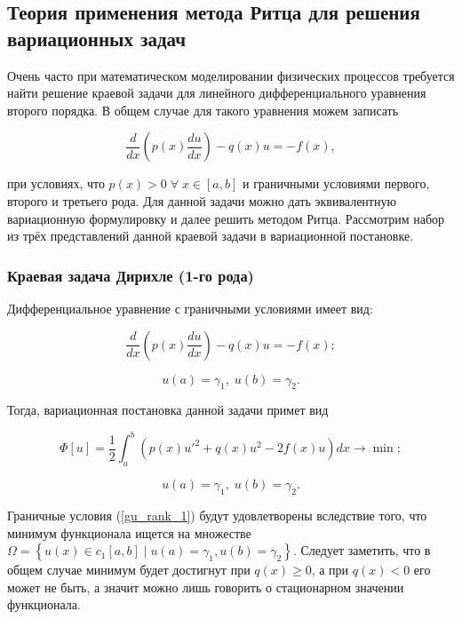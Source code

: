 \documentclass{article}
\begin{document}
\subsection{Теория применения метода Ритца для решения вариационных задач}

Очень часто при математическом моделировании физических процессов требуется найти решение краевой задачи для линейного дифференциального уравнения второго порядка. В общем случае для такого уравнения можем записать

\begin{equation}\label{ODE_rank_2}
	\frac{d }{dx} \left( p(x) \frac{du}{dx} \right) - q(x)u = -f(x),
\end{equation}

\noindent при условиях, что $p(x) > 0 \; \forall \; x \in \left[ a, b \right]$ и граничными условиями первого, второго и третьего рода. Для данной задачи можно дать эквивалентную вариационную формулировку и далее решить методом Ритца.
Рассмотрим набор из трёх представлений данной краевой задачи в вариационной постановке.

\subsubsection{Краевая задача Дирихле (1-го рода)}

Дифференциальное уравнение с граничными условиями имеет вид:

\begin{displaymath}
	\frac{d }{dx} \left( p(x) \frac{du}{dx} \right) - q(x)u = -f(x);
\end{displaymath}

\begin{equation} \label{gu_rank_1}
	u(a) = \gamma_{1}, \; u(b) = \gamma_{2}.
\end{equation}

\noindent Тогда, вариационная постановка данной задачи примет вид

\begin{displaymath}
	\Phi[u] = \frac{1}{2} \int_{a}^{b} \left( p(x)u'^{2} + q(x)u^{2} - 2f(x)u \right)dx \to \min;
\end{displaymath}

\begin{displaymath}
	u(a) = \gamma_{1}, \; u(b) = \gamma_{2}.
\end{displaymath}

Граничные условия (\ref{gu_rank_1}) будут удовлетворены вследствие того, что минимум функционала ищется на множестве $\Omega = \left\{ u(x) \in c_{1}\left[ a, b \right] \; | \; u(a)=\gamma_{1}, u(b)=\gamma_{2} \right\}$. Следует заметить, что в общем случае минимум будет достигнут при $q(x) \geq 0$, а при $q(x) < 0$ его может не быть, а значит можно лишь говорить о стационарном значении функционала.
\end{document}
